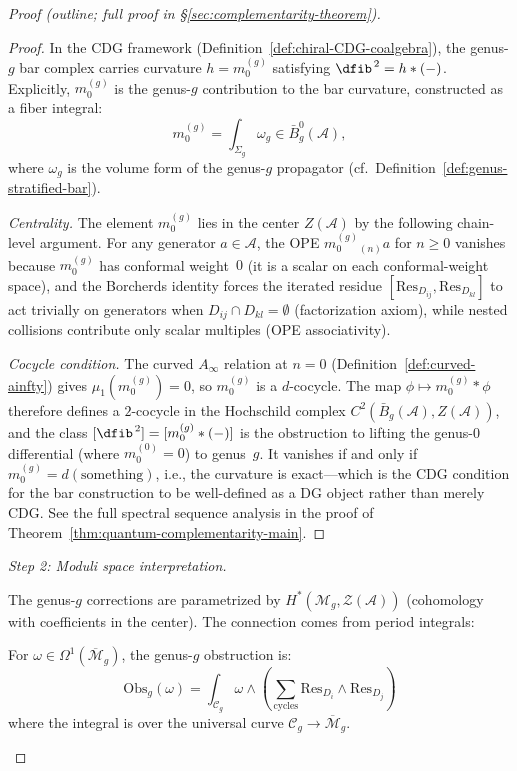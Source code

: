 \begin{proof}[Proof (outline; full proof in \S\textup{\ref{sec:complementarity-theorem}})]
\begin{proof}
In the CDG framework (Definition~\ref{def:chiral-CDG-coalgebra}), the genus-$g$
bar complex carries curvature $h = m_0^{(g)}$ satisfying $\dfib^{\,2} = h \ast (-)$.
Explicitly, $m_0^{(g)}$ is the genus-$g$ contribution to the bar curvature,
constructed as a fiber integral:
\[
m_0^{(g)} = \int_{\Sigma_g} \omega_g \in \bar{B}^0_g(\mathcal{A}),
\]
where $\omega_g$ is the volume form of the genus-$g$ propagator
(cf.\ Definition~\ref{def:genus-stratified-bar}).

\emph{Centrality.}
The element $m_0^{(g)}$ lies in the center $Z(\mathcal{A})$ by the
following chain-level argument.  For any generator $a \in \mathcal{A}$,
the OPE $m_0^{(g)}{}_{(n)} a$ for $n \geq 0$ vanishes because $m_0^{(g)}$
has conformal weight~$0$ (it is a scalar on each conformal-weight space),
and the Borcherds identity forces the iterated residue
$[\mathrm{Res}_{D_{ij}}, \mathrm{Res}_{D_{kl}}]$ to act trivially on
generators when $D_{ij} \cap D_{kl} = \emptyset$ (factorization axiom),
while nested collisions contribute only scalar multiples (OPE associativity).

\emph{Cocycle condition.}
The curved $A_\infty$ relation at $n=0$
(Definition~\ref{def:curved-ainfty}) gives
$\mu_1(m_0^{(g)}) = 0$, so $m_0^{(g)}$ is a $d$-cocycle.  The map
$\phi \mapsto m_0^{(g)} \ast \phi$ therefore defines a $2$-cocycle in
the Hochschild complex $C^2(\bar{B}_g(\mathcal{A}), Z(\mathcal{A}))$,
and the class $[\dfib^{\,2}] = [m_0^{(g)} \ast (-)]$ is the obstruction to
lifting the genus-$0$ differential (where $m_0^{(0)} = 0$) to genus~$g$.
It vanishes if and only if $m_0^{(g)} = d(\text{something})$, i.e., the
curvature is exact---which is the CDG condition for the bar construction
to be well-defined as a DG object rather than merely CDG.
See the full spectral sequence analysis in the proof of
Theorem~\ref{thm:quantum-complementarity-main}.
\end{proof}

\emph{Step 2: Moduli space interpretation.}

The genus-$g$ corrections are parametrized by $H^*(\mathcal{M}_g, \mathcal{Z}(\mathcal{A}))$ (cohomology with coefficients in the center).  The connection comes from period integrals:

\begin{lemma}\label{lem:period-integral}
For $\omega \in \Omega^1(\overline{\mathcal{M}}_g)$, the genus-$g$ obstruction is:
\[\mathrm{Obs}_g(\omega) = \int_{\mathcal{C}_g} \omega \wedge
\left(\sum_{\text{cycles}} \mathrm{Res}_{D_i} \wedge \mathrm{Res}_{D_j}\right)\]
where the integral is over the universal curve $\mathcal{C}_g \to \overline{\mathcal{M}}_g$.
\end{lemma}


\end{proof}

